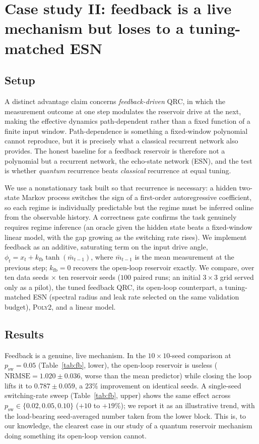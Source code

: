\documentclass[11pt,a4paper]{article}
\newcommand{\nrmse}{\mathrm{NRMSE}}
\begin{document}
\section{Case study II: feedback is a live mechanism but loses to a
tuning-matched ESN}
\label{sec:fb}

\subsection{Setup}

A distinct advantage claim concerns \emph{feedback-driven} QRC, in which the
measurement outcome at one step modulates the reservoir drive at the next,
making the effective dynamics path-dependent rather than a fixed function of a
finite input window. Path-dependence is something a fixed-window polynomial
cannot reproduce, but it is precisely what a classical recurrent network also
provides. The honest baseline for a feedback reservoir is therefore not a
polynomial but a recurrent network, the echo-state network (ESN), and the test
is whether \emph{quantum} recurrence beats \emph{classical} recurrence at equal
tuning.

We use a nonstationary task built so that recurrence is necessary: a hidden
two-state Markov process switches the sign of a first-order autoregressive
coefficient, so each regime is individually predictable but the regime must be
inferred online from the observable history. A correctness gate confirms the
task genuinely requires regime inference (an oracle given the hidden state beats
a fixed-window linear model, with the gap growing as the switching rate rises).
We implement feedback as an additive, saturating term on the input drive angle,
$\phi_t = x_t + k_{\mathrm{fb}}\tanh(\bar m_{t-1})$, where $\bar m_{t-1}$ is the
mean measurement at the previous step; $k_{\mathrm{fb}}=0$ recovers the
open-loop reservoir exactly. We compare, over ten data seeds $\times$ ten
reservoir seeds ($100$ paired runs; an initial $3\times3$ grid served only as
a pilot), the tuned feedback QRC, its open-loop counterpart, a
tuning-matched ESN (spectral radius and leak rate selected on the same
validation budget), \textsc{Poly2}, and a linear model.

\subsection{Results}

Feedback is a genuine, live mechanism. In the $10\times10$-seed comparison at
$p_{\mathrm{sw}}=0.05$ (Table~\ref{tab:fb}, lower), the open-loop reservoir is
useless ($\nrmse = 1.020 \pm 0.036$, worse than the mean predictor) while
closing the loop lifts it to $0.787 \pm 0.059$, a $23\%$ improvement on
identical seeds. A single-seed switching-rate sweep (Table~\ref{tab:fb}, upper)
shows the same effect across $p_{\mathrm{sw}}\in\{0.02,0.05,0.10\}$
($+10$ to $+19\%$); we report it as an illustrative trend, with the load-bearing
seed-averaged number taken from the lower block. This is, to our knowledge, the
clearest case in our study of a quantum reservoir mechanism doing something its
open-loop version cannot.
\end{document}
